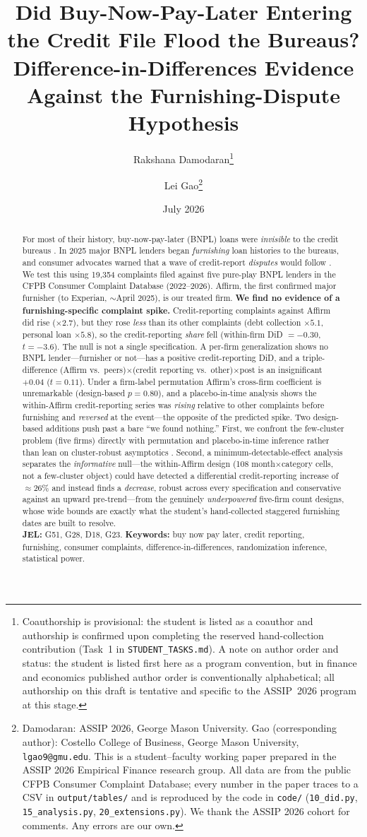\documentclass[12pt]{article}
\title{\textbf{Did Buy-Now-Pay-Later Entering the Credit File Flood the Bureaus?\\
Difference-in-Differences Evidence Against the Furnishing-Dispute Hypothesis}}
\author{Rakshana Damodaran\thanks{Coauthorship is provisional: the student is listed as a coauthor and authorship is confirmed upon completing the reserved hand-collection contribution (Task~1 in \texttt{STUDENT\_TASKS.md}). A note on author order and status: the student is listed first here as a program convention, but in finance and economics published author order is conventionally alphabetical; all authorship on this draft is tentative and specific to the ASSIP~2026 program at this stage.} \and Lei Gao\thanks{Damodaran: ASSIP 2026, George Mason
University. Gao (corresponding author): Costello College of Business, George Mason
University, \texttt{lgao9@gmu.edu}. This is a student--faculty working paper prepared in the
ASSIP 2026 Empirical Finance research group. All data are from the public CFPB Consumer
Complaint Database; every number in the paper traces to a CSV in \texttt{output/tables/} and
is reproduced by the code in \texttt{code/} (\texttt{10\_did.py}, \texttt{15\_analysis.py},
\texttt{20\_extensions.py}). We thank the ASSIP 2026 cohort for comments. Any errors are our
own.}}
\date{July 2026}
\begin{document}
\maketitle

\begin{abstract}
\noindent For most of their history, buy-now-pay-later (BNPL) loans were \emph{invisible} to
the credit bureaus \citep{dimaggio2022,cfpb2022}. In 2025 major BNPL lenders began
\emph{furnishing} loan histories to the bureaus, and consumer advocates warned that a wave of
credit-report \emph{disputes} would follow \citep{cfpb2024}. We test this using 19{,}354
complaints filed against five pure-play BNPL lenders in the CFPB Consumer Complaint Database
(2022--2026). Affirm, the first confirmed major furnisher (to Experian, $\sim$April 2025), is
our treated firm. \textbf{We find no evidence of a furnishing-specific complaint spike.}
Credit-reporting complaints against Affirm did rise ($\times 2.7$), but they rose \emph{less}
than its other complaints (debt collection $\times 5.1$, personal loan $\times 5.8$), so the
credit-reporting \emph{share} fell (within-firm DiD $=-0.30$, $t=-3.6$). The null is not a
single specification. A per-firm generalization shows no BNPL lender---furnisher or not---has
a positive credit-reporting DiD, and a triple-difference (Affirm vs.\ peers)$\times$(credit
reporting vs.\ other)$\times$post is an insignificant $+0.04$ ($t=0.11$). Under a firm-label
permutation Affirm's cross-firm coefficient is unremarkable (design-based $p=0.80$), and a
placebo-in-time analysis shows the within-Affirm credit-reporting series was \emph{rising}
relative to other complaints before furnishing and \emph{reversed} at the event---the opposite
of the predicted spike. Two design-based additions push past a bare ``we found nothing.''
First, we confront the few-cluster problem (five firms) directly with permutation and
placebo-in-time inference rather than lean on cluster-robust asymptotics
\citep{cameron2008,mackinnon2017,conley2011}. Second, a minimum-detectable-effect analysis
separates the \emph{informative} null---the within-Affirm design (108 month$\times$category
cells, not a few-cluster object) could have detected a differential credit-reporting increase of
$\approx$26\% and instead finds a \emph{decrease}, robust across every specification and
conservative against an upward pre-trend---from the genuinely \emph{underpowered} five-firm count
designs, whose wide bounds are exactly what the student's hand-collected staggered furnishing
dates are built to resolve.\\[4pt]
\noindent\textbf{JEL:} G51, G28, D18, G23. \quad
\textbf{Keywords:} buy now pay later, credit reporting, furnishing, consumer complaints,
difference-in-differences, randomization inference, statistical power.
\end{abstract}
\end{document}
